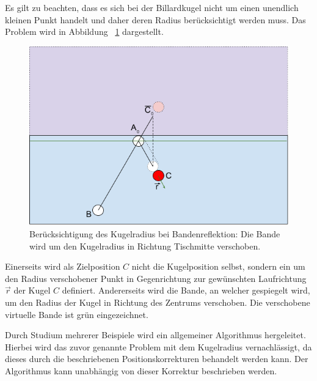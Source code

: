 Es gilt zu beachten, dass es sich bei der Billardkugel nicht um einen unendlich kleinen Punkt handelt und
daher deren Radius berücksichtigt werden muss.
Das Problem wird in Abbildung ~\ref{fig:bandenreflektion_kugelradius} dargestellt.
\begin{figure}[h]
    \begin{center}
        \includegraphics[width=0.5\linewidth]{../common/03_billiard_ai/resources/48_bandenreflektion_kugelradius.png}
    \end{center}
    \caption{Berücksichtigung des Kugelradius bei Bandenreflektion: Die Bande wird um den Kugelradius in Richtung Tischmitte verschoben.}
    \label{fig:bandenreflektion_kugelradius}
\end{figure}

Einerseits wird als Zielposition $C$ nicht die Kugelposition selbst, sondern ein um den Radius verschobener Punkt in
Gegenrichtung zur gewünschten Laufrichtung $\vec{r}$ der Kugel $C$ definiert. Andererseits wird die Bande, an welcher
gespiegelt wird, um den Radius der Kugel in Richtung des Zentrums verschoben. Die verschobene virtuelle Bande ist grün eingezeichnet.

Durch Studium mehrerer Beispiele wird ein allgemeiner Algorithmus hergeleitet. Hierbei wird das zuvor genannte Problem
mit dem Kugelradius vernachlässigt, da dieses durch die beschriebenen Positionskorrekturen behandelt werden kann.
Der Algorithmus kann unabhängig von dieser Korrektur beschrieben werden.


